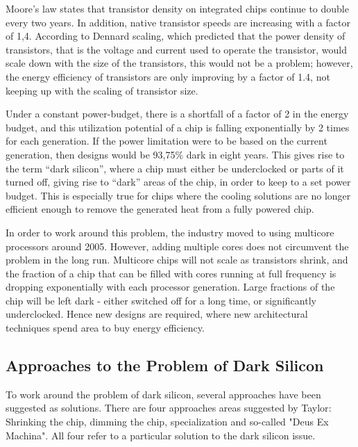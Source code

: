 Moore's law states that transistor density on integrated chips continue to double every
two years. In addition, native transistor speeds are increasing with a factor of 1,4.
According to Dennard scaling, which predicted that the power density of transistors, that
is the voltage and current used to operate the transistor, would scale down with the
size of the transistors, this would not be a problem; however, the energy efficiency
of transistors are only improving by a factor of 1.4, not keeping up with the scaling
of transistor size.

Under a constant power-budget, there is a shortfall of a factor of 2 in the energy budget,
and this utilization potential of a chip is falling exponentially by 2 times for each generation.
If the power limitation were to be based on the current generation, then designs would be 93,75\% dark in eight years.
This gives rise to the term ``dark silicon'', where a chip must either be underclocked or parts of
it turned off, giving rise to ``dark'' areas of the chip, in order to keep to a set power budget.
This is especially true for chips where the cooling solutions are no longer efficient enough to remove
the generated heat from a fully powered chip.

In order to work around this problem, the industry moved to using multicore processors around 2005.
However, adding multiple cores does not circumvent the problem in the long run.
Multicore chips will not scale as transistors shrink, and the fraction of a chip that can be filled with cores running at full frequency is dropping exponentially with each processor generation. 
Large fractions of the chip will be left dark - either switched off for a long time, or significantly underclocked.
Hence new designs are required, where new architectural techniques spend area to buy energy efficiency. \cite{dark-silicon}

\subsection{Approaches to the Problem of Dark Silicon}
\label{sec:taylor}

To work around the problem of dark silicon, several approaches have been suggested as solutions.
There are four approaches areas suggested by Taylor\cite{dark-silicon}: Shrinking the chip, dimming the chip, specialization and so-called "Deus Ex Machina".
All four refer to a particular solution to the dark silicon issue.


